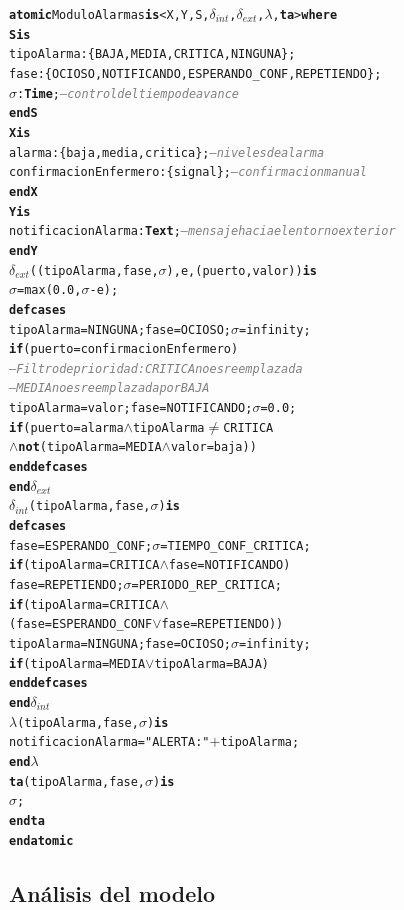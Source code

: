 \documentclass[12pt, a4paper]{article}
\newcommand{\cmlplus}{$+$}
\newcommand{\cmlwedge}{$\wedge$}
\newcommand{\cmlneq}{$\neq$}
\newcommand{\cmlvee}{$\vee$}
\newcommand{\kw}[1]{\textbf{#1}}
\newcommand{\cmlTime}{\textbf{Time}}
\newcommand{\cmlsigma}{$\sigma$}
\newcommand{\dint}{$\delta_{\mathit{int}}$}
\newcommand{\dext}{$\delta_{\mathit{ext}}$}
\newcommand{\clambda}{$\lambda$}
\newcommand{\cmlta}{\textbf{ta}}
\newcommand{\cmlcomment}[1]{\textit{\textcolor{gray}{#1}}}
\newenvironment{cmldevs}{%
  \begin{alltt}\small%
}{%
  \end{alltt}%
}
\begin{document}
\begin{center}
\begin{cmldevs}
\kw{atomic} ModuloAlarmas \kw{is} <X, Y, S, \dint{}, \dext{}, \clambda{}, \cmlta{}> \kw{where}
\kw{S is}
    tipoAlarma : \{BAJA, MEDIA, CRITICA, NINGUNA\};
    fase       : \{OCIOSO, NOTIFICANDO, ESPERANDO\_CONF, REPETIENDO\};
    \cmlsigma{}      : \cmlTime{}; \cmlcomment{-- control del tiempo de avance}
\kw{end S}
\kw{X is}
    alarma                : \{baja, media, critica\}; \cmlcomment{-- niveles de alarma}
    confirmacionEnfermero : \{signal\};               \cmlcomment{-- confirmacion manual}
\kw{end X}
\kw{Y is}
    notificacionAlarma : \kw{Text}; \cmlcomment{-- mensaje hacia el entorno exterior}
\kw{end Y}
\dext{}((tipoAlarma, fase, \cmlsigma{}), e, (puerto, valor)) \kw{is}
    \cmlsigma{} = max(0.0, \cmlsigma{} - e);
    \kw{defcases}
        tipoAlarma = NINGUNA; fase = OCIOSO; \cmlsigma{} = infinity;
            \kw{if} (puerto = confirmacionEnfermero)
        \cmlcomment{-- Filtro de prioridad: CRITICA no es reemplazada}
        \cmlcomment{-- MEDIA no es reemplazada por BAJA}
        tipoAlarma = valor; fase = NOTIFICANDO; \cmlsigma{} = 0.0;
            \kw{if} (puerto = alarma \cmlwedge{} tipoAlarma \cmlneq{} CRITICA
                \cmlwedge{} \kw{not}(tipoAlarma = MEDIA \cmlwedge{} valor = baja))
    \kw{end defcases}
\kw{end} \dext{}
\dint{}(tipoAlarma, fase, \cmlsigma{}) \kw{is}
    \kw{defcases}
        fase = ESPERANDO\_CONF; \cmlsigma{} = TIEMPO\_CONF\_CRITICA;
            \kw{if} (tipoAlarma = CRITICA \cmlwedge{} fase = NOTIFICANDO)
        fase = REPETIENDO; \cmlsigma{} = PERIODO\_REP\_CRITICA;
            \kw{if} (tipoAlarma = CRITICA \cmlwedge{}
            (fase = ESPERANDO\_CONF \cmlvee{} fase = REPETIENDO))
        tipoAlarma = NINGUNA; fase = OCIOSO; \cmlsigma{} = infinity;
            \kw{if} (tipoAlarma = MEDIA \cmlvee{} tipoAlarma = BAJA)
    \kw{end defcases}
\kw{end} \dint{}
\clambda{}(tipoAlarma, fase, \cmlsigma{}) \kw{is}
    notificacionAlarma = "ALERTA: " \cmlplus{} tipoAlarma;
\kw{end} \clambda{}
\cmlta{}(tipoAlarma, fase, \cmlsigma{}) \kw{is}
    \cmlsigma{};
\kw{end} \cmlta{}
\kw{end atomic}
\end{cmldevs}
\label{fig:modulo-alarmas}
\end{center}

\subsection*{Análisis del modelo}
\end{document}
